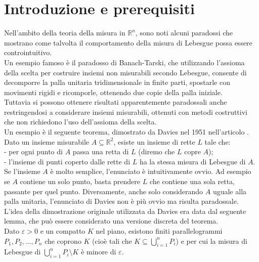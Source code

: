 \documentclass[a4paper, twoside]{article}
\newcommand{\R}{\mathbb{R}}
\newcommand{\e}{\varepsilon}
\newcommand{\<}{\langle}
\renewcommand{\>}{\rangle}
\begin{document}


\tableofcontents
\clearpage

\section{Introduzione e prerequisiti}
	
	Nell'ambito della teoria della misura in $\R^n$, sono noti alcuni paradossi che mostrano come talvolta il comportamento della misura di Lebesgue possa essere controintuitivo.\\
	Un esempio famoso è il paradosso di Banach-Tarski, che utilizzando l’assioma della scelta per costruire insiemi non misurabili secondo Lebesgue, consente di decomporre la palla unitaria tridimensionale in finite parti, spostarle con movimenti rigidi e ricomporle, ottenendo due copie della palla iniziale.\\
	Tuttavia si possono ottenere risultati apparentemente paradossali anche restringendosi a considerare insiemi misurabili, ottenuti con metodi costruttivi che non richiedono l’uso dell'assioma della scelta.\\
	Un esempio è il seguente teorema, dimostrato da Davies nel 1951 nell'articolo \Cite{1}. \\
	Dato un insieme misurabile $A \subseteq \mathbb{R}^{2}$, esiste un insieme di rette $L$ tale che:\\
	- per ogni punto di $A$ passa una retta di $L$ (diremo che $L$ copre $A$);\\
	- l'insieme di punti coperto dalle rette di $L$ ha la stessa misura di Lebesgue di $A$.\\
	
	Se l’insieme $A$ è molto semplice, l’enunciato è intuitivamente ovvio. Ad esempio se $A$ contiene un solo punto, basta prendere $L$ che contiene una sola retta, passante per quel punto. Diversamente, anche solo considerando $A$ uguale alla palla unitaria, l’enunciato di Davies non è più ovvio ma risulta paradossale. \\
	L’idea della dimostrazione originale utilizzata da Davies era data dal seguente lemma, che può essere considerato una versione discreta del teorema.\\
	Dato $\e >0$ e un compatto $K$ nel piano, esistono finiti parallelogrammi $P_1, P_2, …,P_n$ che coprono $K$ (cioè tali che $K \subseteq \bigcup_{i=1}^nP_i$) e per cui la misura di Lebesgue di $\bigcup_{i=1}^n P_i \setminus K$ è minore di $\e$. \\
	
\end{document}
